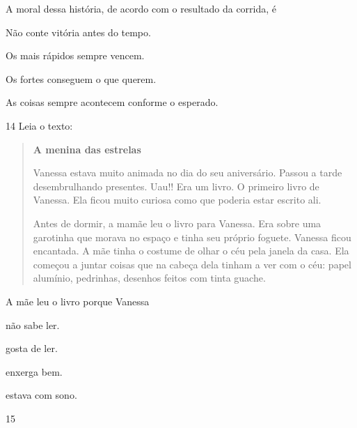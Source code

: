 
A moral dessa história, de acordo com o resultado da corrida, é

\begin{escolha}
\item Não conte vitória antes do tempo.

\item Os mais rápidos sempre vencem.

\item Os fortes conseguem o que querem.

\item As coisas sempre acontecem conforme o esperado.
\end{escolha}


\num{14} Leia o texto:

\begin{quote}
\textbf{A menina das estrelas}

Vanessa estava muito animada no dia do seu aniversário. Passou a tarde
desembrulhando presentes. Uau!! Era um livro. O primeiro livro de
Vanessa. Ela ficou muito curiosa como que poderia estar escrito ali.

Antes de dormir, a mamãe leu o livro para Vanessa. Era sobre uma
garotinha que morava no espaço e tinha seu próprio foguete. Vanessa
ficou encantada. A mãe tinha o costume de olhar o céu pela janela da
casa. Ela começou a juntar coisas que na cabeça dela tinham a ver com o
céu: papel alumínio, pedrinhas, desenhos feitos com tinta guache.
\end{quote}


A mãe leu o livro porque Vanessa

\begin{escolha}
\item não sabe ler.

\item gosta de ler.

\item enxerga bem.

\item estava com sono.
\end{escolha}


\num{15}

